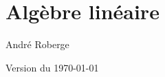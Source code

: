 \chapter*{\Huge Algèbre linéaire}
\thispagestyle{empty}
\begin{center}
\Large \textcolor{MainRed}{André Roberge}
\end{center}
\vfill

%
%
%
%

\vfill
{\tiny Version du \today}